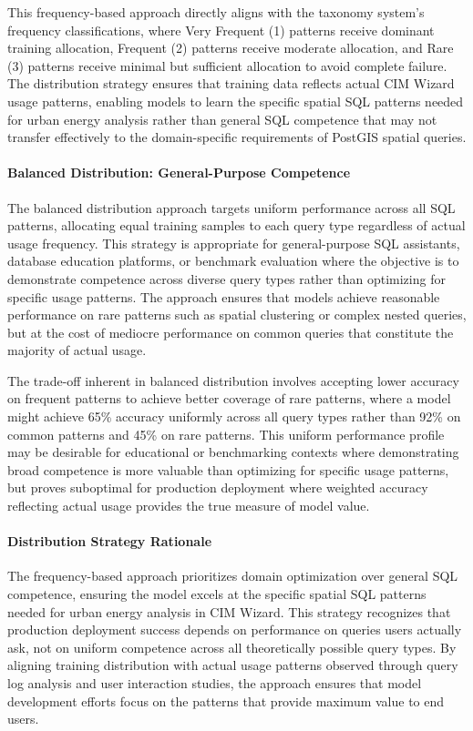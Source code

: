This frequency-based approach directly aligns with the taxonomy system's frequency classifications, where Very Frequent (1) patterns receive dominant training allocation, Frequent (2) patterns receive moderate allocation, and Rare (3) patterns receive minimal but sufficient allocation to avoid complete failure. The distribution strategy ensures that training data reflects actual CIM Wizard usage patterns, enabling models to learn the specific spatial SQL patterns needed for urban energy analysis rather than general SQL competence that may not transfer effectively to the domain-specific requirements of PostGIS spatial queries.

\paragraph{Balanced Distribution: General-Purpose Competence}

The balanced distribution approach targets uniform performance across all SQL patterns, allocating equal training samples to each query type regardless of actual usage frequency. This strategy is appropriate for general-purpose SQL assistants, database education platforms, or benchmark evaluation where the objective is to demonstrate competence across diverse query types rather than optimizing for specific usage patterns. The approach ensures that models achieve reasonable performance on rare patterns such as spatial clustering or complex nested queries, but at the cost of mediocre performance on common queries that constitute the majority of actual usage.

The trade-off inherent in balanced distribution involves accepting lower accuracy on frequent patterns to achieve better coverage of rare patterns, where a model might achieve 65\% accuracy uniformly across all query types rather than 92\% on common patterns and 45\% on rare patterns. This uniform performance profile may be desirable for educational or benchmarking contexts where demonstrating broad competence is more valuable than optimizing for specific usage patterns, but proves suboptimal for production deployment where weighted accuracy reflecting actual usage provides the true measure of model value.

\paragraph{Distribution Strategy Rationale}

The frequency-based approach prioritizes domain optimization over general SQL competence, ensuring the model excels at the specific spatial SQL patterns needed for urban energy analysis in CIM Wizard. This strategy recognizes that production deployment success depends on performance on queries users actually ask, not on uniform competence across all theoretically possible query types. By aligning training distribution with actual usage patterns observed through query log analysis and user interaction studies, the approach ensures that model development efforts focus on the patterns that provide maximum value to end users.

